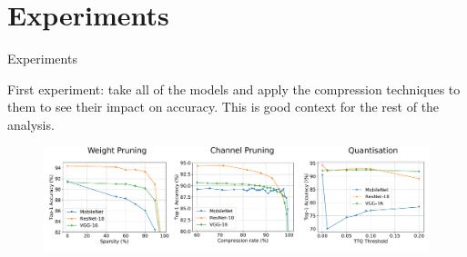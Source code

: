\documentclass[xcolor=dvipsnames]{beamer}
\begin{document}
\section{Experiments}

\begin{frame}{Experiments}

First experiment: take all of the models and apply the compression techniques to them to see their impact on accuracy.
This is good context for the rest of the analysis.
    
\begin{figure}
    \centering
    \includegraphics[width=11.75cm]{images/accuracies.pdf}
\end{figure}
    
\end{frame}








{ %
    \begin{frame}[plain]
     \end{frame}
}
\end{document}
